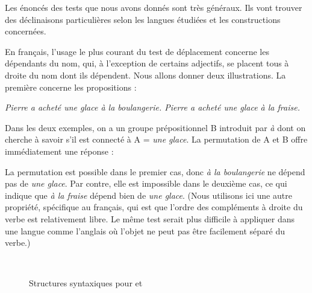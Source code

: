 Les énoncés des tests que nous avons donnés sont très généraux. Ils vont trouver des déclinaisons particulières selon les langues étudiées et les constructions concernées.

En français, l’usage le plus courant du test de déplacement concerne les dépendants du nom, qui, à l’exception de certains adjectifs, se placent tous à droite du nom dont ils dépendent. Nous allons donner deux illustrations. La première concerne les propositions :

\ea
  \ea \itshape Pierre a acheté une glace à la boulangerie.
  \ex \itshape Pierre a acheté une glace à la fraise.
  \z
\z

Dans les deux exemples, on a un groupe prépositionnel B introduit par \textit{à} dont on cherche à savoir s’il est connecté à A = \textit{une glace}. La permutation de A et B offre immédiatement une réponse :

\ea
    \label{ex:boulangerie}
    \label{ex:fraise}
    \z
\z

La permutation est possible dans le premier cas, donc \textit{à la boulangerie} ne dépend pas de \textit{une glace}. Par contre, elle est impossible dans le deuxième cas, ce qui indique que \textit{à la fraise} dépend bien de \textit{une glace}. (Nous utilisons ici une autre propriété, spécifique au français, qui est que l’ordre des compléments à droite du verbe est relativement libre. Le même test serait plus difficile à appliquer dans une langue comme l’anglais où l’objet ne peut pas être facilement séparé du verbe.)

\begin{figure}
\medskip\\
\caption{\label{fig:}Structures syntaxiques pour  et }
\end{figure}

